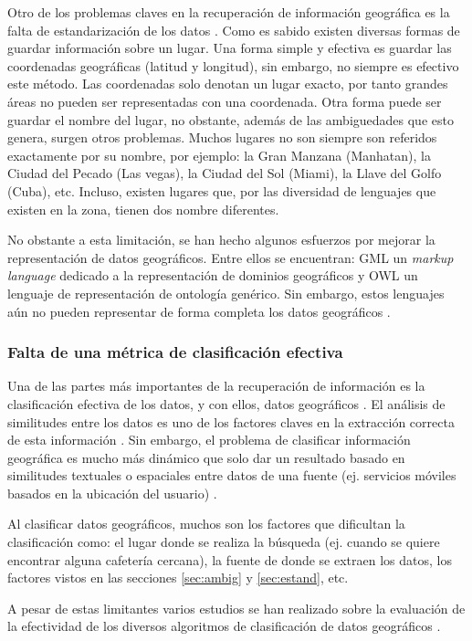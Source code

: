 Otro de los problemas claves en la recuperación de información geográfica es la
falta de estandarización de los datos \cite{deAndrade2014}. Como es sabido
existen diversas formas de guardar información sobre un lugar. Una forma simple
y efectiva es guardar las coordenadas geográficas (latitud y longitud), sin
embargo, no siempre es efectivo este método. Las coordenadas solo denotan un
lugar exacto, por tanto grandes áreas no pueden ser representadas con una
coordenada. Otra forma puede ser guardar el nombre del lugar, no obstante,
además de las ambiguedades que esto genera, surgen otros problemas. Muchos
lugares no son siempre son referidos exactamente por su nombre, por ejemplo: la
Gran Manzana (Manhatan), la Ciudad del Pecado (Las vegas), la Ciudad del Sol
(Miami), la Llave del Golfo (Cuba), etc. Incluso, existen lugares que, por las
diversidad de lenguajes que existen en la zona, tienen dos nombre diferentes.

No obstante a esta limitación, se han hecho algunos esfuerzos por mejorar la
representación de datos geográficos. Entre ellos se encuentran: GML un
\emph{markup language} dedicado a la representación de dominios geográficos y
OWL un lenguaje de representación de ontología genérico. Sin embargo, estos
lenguajes aún no pueden representar de forma completa los datos geográficos
\cite{abdelmoty2005}.

\subsubsection{Falta de una métrica de clasificación efectiva}\label{sec:metric}

Una de las partes más importantes de la recuperación de información es la
clasificación efectiva de los datos, y con ellos, datos geográficos
\cite{purves2004,mandl2008,cai2011}. El análisis de similitudes entre los datos
es uno de los factores claves en la extracción correcta de esta información
\cite{janowicz2011}. Sin embargo, el problema de clasificar información
geográfica es mucho más dinámico que solo dar un resultado basado en
similitudes textuales o espaciales entre datos de una fuente (ej. servicios
móviles basados en la ubicación del usuario) \cite{kumar2011}.

Al clasificar datos geográficos, muchos son los factores que dificultan la
clasificación como: el lugar donde se realiza la búsqueda (ej. cuando se quiere
encontrar alguna cafetería cercana), la fuente de donde se extraen los datos,
los factores vistos en las secciones \ref{sec:ambig} y \ref{sec:estand}, etc.

A pesar de estas limitantes varios estudios se han realizado sobre la evaluación
de la efectividad de los diversos algoritmos de clasificación de datos geográficos
 \cite{larson2004jul, larson2004sep}.

